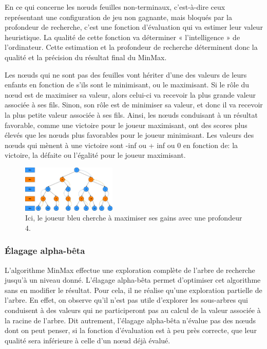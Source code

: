 En ce qui concerne les nœuds feuilles non-terminaux, c’est-à-dire ceux représentant une configuration de jeu non gagnante, mais bloqués par la 
profondeur de recherche, c’est une fonction d’évaluation qui va estimer leur valeur heuristique. La qualité de cette fonction va 
déterminer « l'intelligence » de l'ordinateur. Cette estimation et la profondeur de recherche déterminent donc la qualité et la 
précision du résultat final du MinMax.

Les nœuds qui ne sont pas des feuilles vont hériter d'une des valeurs de leurs enfants en fonction de s'ils sont le minimisant, ou le maximisant.
Si le rôle du nœud est de maximiser sa valeur, alors celui-ci va recevoir la plus grande valeur associée à ses fils. Sinon, son rôle est de 
minimiser sa valeur, et donc il va recevoir la plus petite valeur associée à ses fils.
Ainsi, les nœuds conduisant à un résultat favorable, comme une victoire pour le joueur maximisant, ont des scores plus
élevés que les nœuds plus favorables pour le joueur minimisant. Les valeurs des nœuds qui mènent à une victoire sont -inf ou + inf ou 0 en fonction de:
la victoire, la défaite ou l'égalité pour le joueur maximisant. 


\begin{figure}[h]
    \begin{center}
        \includegraphics[width=0.4\textwidth]{root/MinMax.jpeg}
    \end{center}
    \caption{Ici, le joueur bleu cherche à maximiser ses gains avec une profondeur 4.}\label{fig:min_max}
\end{figure}


\subsubsection{Élagage alpha-bêta}
L'algorithme MinMax effectue une exploration complète de l'arbre de recherche jusqu'à un niveau donné. L'élagage alpha-bêta permet d'optimiser 
cet algorithme sans en modifier le résultat. Pour cela, il ne réalise qu'une exploration
partielle de l'arbre. En effet, on observe qu'il n'est pas utile d'explorer les sous-arbres qui conduisent à des valeurs
qui ne participeront pas au calcul de la valeur associée à la racine de l'arbre. Dit autrement, l'élagage alpha-bêta n'évalue pas des nœuds
dont on peut penser, si la fonction d'évaluation est à peu près correcte, que leur qualité sera inférieure à celle d'un nœud déjà évalué.

